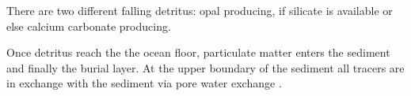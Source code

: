 There are two different falling detritus: opal producing, if silicate is available or else calcium carbonate producing. %

Once detritus reach the the ocean floor, particulate matter enters the sediment and finally the burial layer. At the upper boundary of the sediment all tracers are in exchange with the sediment via pore water exchange \citep{Heinze1999}. 





